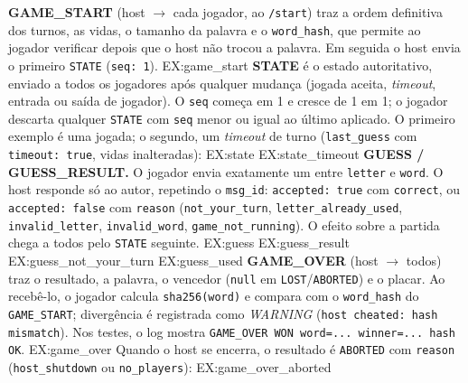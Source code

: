 \documentclass[11pt,a4paper]{article}
\begin{document}
\textbf{GAME\_START} (host $\rightarrow$ cada jogador, ao \texttt{/start}) traz a ordem definitiva dos turnos, as vidas, o tamanho da palavra e o \texttt{word\_hash}, que permite ao jogador verificar depois que o host não trocou a palavra. Em seguida o host envia o primeiro \texttt{STATE} (\texttt{seq: 1}).
{{EX:game_start}}
\textbf{STATE} é o estado autoritativo, enviado a todos os jogadores após qualquer mudança (jogada aceita, \emph{timeout}, entrada ou saída de jogador). O \texttt{seq} começa em 1 e cresce de 1 em 1; o jogador descarta qualquer \texttt{STATE} com \texttt{seq} menor ou igual ao último aplicado. O primeiro exemplo é uma jogada; o segundo, um \emph{timeout} de turno (\texttt{last\_guess} com \texttt{timeout: true}, vidas inalteradas):
{{EX:state}}
{{EX:state_timeout}}
\textbf{GUESS / GUESS\_RESULT.} O jogador envia exatamente um entre \texttt{letter} e \texttt{word}. O host responde só ao autor, repetindo o \texttt{msg\_id}: \texttt{accepted: true} com \texttt{correct}, ou \texttt{accepted: false} com \texttt{reason} (\texttt{not\_your\_turn}, \texttt{letter\_already\_used}, \texttt{invalid\_letter}, \texttt{invalid\_word}, \texttt{game\_not\_running}). O efeito sobre a partida chega a todos pelo \texttt{STATE} seguinte.
{{EX:guess}}
{{EX:guess_result}}
{{EX:guess_not_your_turn}}
{{EX:guess_used}}
\textbf{GAME\_OVER} (host $\rightarrow$ todos) traz o resultado, a palavra, o vencedor (\texttt{null} em \texttt{LOST}/\texttt{ABORTED}) e o placar. Ao recebê-lo, o jogador calcula \texttt{sha256(word)} e compara com o \texttt{word\_hash} do \texttt{GAME\_START}; divergência é registrada como \emph{WARNING} (\texttt{host cheated: hash mismatch}). Nos testes, o log mostra \texttt{GAME\_OVER WON word=... winner=... \textemdash{} hash OK}.
{{EX:game_over}}
Quando o host se encerra, o resultado é \texttt{ABORTED} com \texttt{reason} (\texttt{host\_shutdown} ou \texttt{no\_players}):
{{EX:game_over_aborted}}
\end{document}
